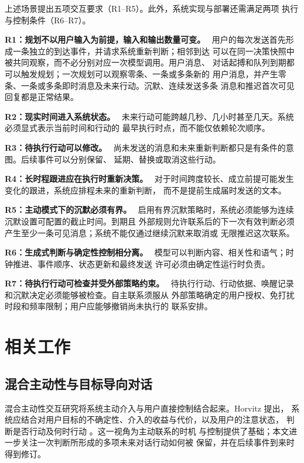 \documentclass[manuscript,nonacm]{acmart}
\newcommand{\zhrequirement}[1]{\par\noindent\textbf{#1。}\ }
\begin{document}
上述场景提出五项交互要求（R1--R5）。此外，系统实现与部署还需满足两项
执行与控制条件（R6--R7）。

\zhrequirement{R1：规划不以用户输入为前提，输入和输出数量可变}
用户的每次发送首先形成一条独立的到达事件，并请求系统重新判断；相邻到达
可以在同一决策快照中被共同观察，而不必分别对应一次模型调用。用户消息、
对话起搏和队列到期都可以触发规划；一次规划可以观察零条、一条或多条新的
用户消息，并产生零条、一条或多条即时消息及未来行动。沉默、连续发送多条
消息和推迟首次可见回复都是正常结果。

\zhrequirement{R2：现实时间进入系统状态}
未来行动可能跨越几秒、几小时甚至几天。系统必须显式表示当前时间和行动的
最早执行时点，而不能仅依赖轮次顺序。

\zhrequirement{R3：待执行行动可以修改}
尚未发送的消息和未来重新判断都只是有条件的意图。后续事件可以分别保留、
延期、替换或取消这些行动。

\zhrequirement{R4：长时程跟进应在执行时重新决策}
对于时间跨度较长、成立前提可能发生变化的跟进，系统应排程未来的重新判断，
而不是提前生成届时发送的文本。

\zhrequirement{R5：主动模式下的沉默必须有界}
启用有界沉默策略时，系统必须能够为连续沉默设置可配置的截止时间。到期且
外部规则允许联系后的下一次有效判断必须产生至少一条可见消息；系统不能仅通过继续沉默来取消或
无限推迟这次联系。

\zhrequirement{R6：生成式判断与确定性控制相分离}
模型可以判断内容、相关性和语气；时钟推进、事件顺序、状态更新和最终发送
许可必须由确定性运行时负责。

\zhrequirement{R7：待执行行动可检查并受外部策略约束}
待执行行动、行动依据、唤醒记录和沉默决定必须能够被检查。自主联系须服从
外部策略确定的用户授权、免打扰时段和频率限制；用户应能够撤销尚未执行的
联系安排。

\section{相关工作}

\subsection{混合主动性与目标导向对话}

混合主动性交互研究将系统主动介入与用户直接控制结合起来。Horvitz 提出，
系统应结合对用户目标的不确定性、介入的收益与代价，以及用户的注意状态，
判断是否行动及何时行动 \cite{horvitz1999mixed}。这一视角为主动联系的时机
与控制提供了基础；本文进一步关注一次判断所形成的多项未来对话行动如何被
保留，并在后续事件到来时得到修订。
\end{document}
